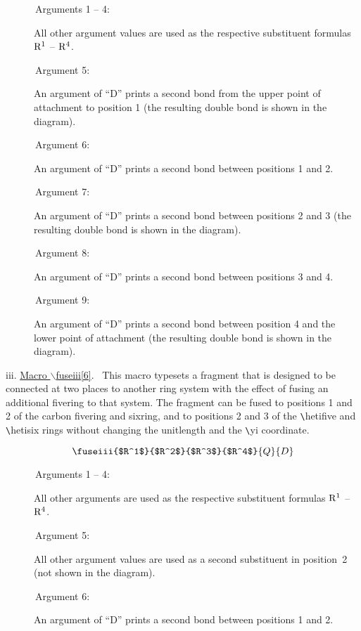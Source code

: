  \begin{description}
 \item[{\rm \ \ \ \ \ \ Arguments 1 -- 4:}] \rhq  All other
      argument values are used as the respective substituent
      formulas ${\rm R^1}$ -- ${\rm R^4}$.
 \item[{\rm \ \ \ \ \ \ Argument 5:}] An argument of ``D'' prints
      a second bond from the upper point of attachment to
      position 1 (the resulting double bond is shown in the
      diagram). \ri    
 \item[{\rm \ \ \ \ \ \ Argument 6:}] An argument of ``D'' prints
      a second bond between positions 1 and 2. \ri  
 \item[{\rm \ \ \ \ \ \ Argument 7:}] An argument of ``D'' prints
      a second bond between positions 2 and 3 (the resulting 
      double bond is shown in the diagram). \ri 
 \item[{\rm \ \ \ \ \ \ Argument 8:}] An argument of ``D'' prints 
      a second bond between positions 3 and 4. \ri 
 \item[{\rm \ \ \ \ \ \ Argument 9:}] An argument of ``D'' prints
      a second bond between position 4 and the lower point
      of attachment (the resulting double bond is shown in
      the diagram). \ri 
 \end{description}
 \newpage
 \indent iii. \underline{Macro $\backslash $fuseiii[6]}.
 \ This macro typesets a fragment that is designed to be
 connected at two places to another ring system with the
 effect of fusing an additional fivering to that system.
 The fragment can be fused to positions 1 and 2 of the
 carbon fivering and sixring, and to positions 2 and 3 of
 the \verb+\+hetifive and \verb+\+hetisix rings  
 without changing the unitlength and the \verb+\+yi
 coordinate.

 \[ \fuseiii{$R^1$}{$R^2$}{$R^3$}{$R^4$}{Q}{D}   \]

 \begin{description}
 \item[{\rm \ \ \ \ \ \ Arguments 1 -- 4:}] \rhq  All other
      arguments are used as the respective substituent
      formulas ${\rm R^1}$ -- ${\rm R^4}$.
 \item[{\rm \ \ \ \ \ \ Argument 5:}] \rhq  All other argument
      values are used as a second substituent in position~2
      (not shown in the diagram).
 \item[{\rm \ \ \ \ \ \ Argument 6:}] An argument of ``D''
      prints a second bond between positions 1 and 2. \ri 
 \end{description}


